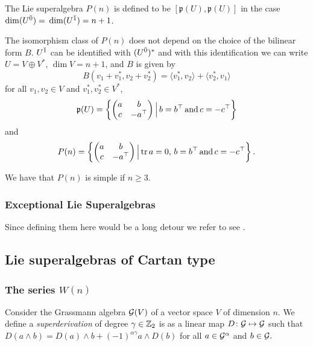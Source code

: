 The Lie superalgebra $P(n)$ is defined to be $[\mathfrak{p}(U),\mathfrak{p}(U)]$ in the case \\ $\dim (U^{\bar0}) =$ $\operatorname{dim} (U^{\bar1}) = n+1$.

The isomorphism class of $P(n)$ does not depend on the choice of the bilinear form $B$. %
$U^{\bar1}$ can be identified with $(U^{\bar0})^*$ and with this identification we can write $U=V\oplus V^*$, $\operatorname{dim} V = n+1$, and $B$ is given by
\[B(v_1+v^*_1,v_2 + v_2^*) = \langle v_1^*, v_2\rangle + \langle v_2^*, v_1\rangle\] for all $v_1, v_2\in V$ and $v_1^*, v_2^*\in V^*$,%
%
%
\[\mathfrak{p}(U) = \left\{\left(\begin{matrix}
    					a  &  b        \\
   					    c  &  -a^{\top}\\ 
 \end{matrix}
 \right) \Big| \, b=b^{\top} \,\text{and}\, c=-c^{\top}\right\}\]
% 
and
% 
\[P(n) = \left\{\left(\begin{matrix}
    					a  &  b        \\
   					    c  &  -a^{\top}\\ 
 \end{matrix}
 \right)\Big| \operatorname{tr} a = 0,\, b=b^{\top} \,\text{and}\, c=-c^{\top}\right\}.\]
 
 We have that $P(n)$ is simple if $n\geq 3$.

\subsubsection{Exceptional Lie Superalgebras} Since defining them here would be a long detour we refer to see \cite{artigokac}.

\subsection{Lie superalgebras of Cartan type}



\subsubsection{The series $W(n)$}
Consider the Grassmann algebra $\mathcal G(V)$ of a vector space $V$ of dimension $n$. We define a \emph{superderivation} of degree $\gamma\in\mathbb{Z}_{2}$ is as a linear map $D\colon \mathcal G \mapsto \mathcal G$ such that $D (a\wedge b)= D (a)\wedge b + (-1)^{\alpha\gamma} a\wedge D (b)$ for all $a \in \mathcal G^{\alpha}$ and $b\in \mathcal G.$

